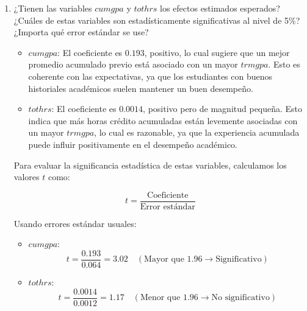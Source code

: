 \documentclass[10pt,a4paper]{article}
\begin{document}
\begin{enumerate}
    \item ¿Tienen las variables  $cumgpa$ y $tothrs$ los efectos estimados esperados? ¿Cuáles
de estas variables son estadísticamente significativas al nivel de 5\%? ¿Importa qué error
estándar se use?

{\color{blue}



\begin{itemize}
    \item \(cumgpa\): El coeficiente es \(0.193\), positivo, lo cual sugiere que un mejor promedio acumulado previo está asociado con un mayor \(trmgpa\). Esto es coherente con las expectativas, ya que los estudiantes con buenos historiales académicos suelen mantener un buen desempeño.
    \item \(tothrs\): El coeficiente es \(0.0014\), positivo pero de magnitud pequeña. Esto indica que más horas crédito acumuladas están levemente asociadas con un mayor \(trmgpa\), lo cual es razonable, ya que la experiencia acumulada puede influir positivamente en el desempeño académico.
\end{itemize}



Para evaluar la significancia estadística de estas variables, calculamos los valores \(t\) como:

\[
t = \frac{\text{Coeficiente}}{\text{Error estándar}}
\]

Usando errores estándar usuales:
\begin{itemize}
       \item \(cumgpa\): \[
    t = \frac{0.193}{0.064} = 3.02 \quad (\text{Mayor que } 1.96 \rightarrow \text{Significativo})
    \]
    \item \(tothrs\): \[
    t = \frac{0.0014}{0.0012} = 1.17 \quad (\text{Menor que } 1.96 \rightarrow \text{No significativo})
    \]
\end{itemize}

}
\end{enumerate}
\end{document}
